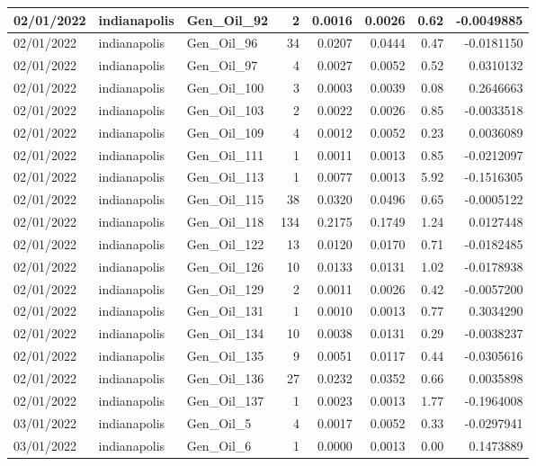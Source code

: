 \documentclass[
  letterpaper,
  DIV=11,
  numbers=noendperiod]{scrartcl}
\begin{document}
\begin{tabular}{l|l|l|r|r|r|r|r}
\hline
02/01/2022 & indianapolis & Gen\_Oil\_92 & 2 & 0.0016 & 0.0026 & 0.62 & -0.0049885\\
\hline
02/01/2022 & indianapolis & Gen\_Oil\_96 & 34 & 0.0207 & 0.0444 & 0.47 & -0.0181150\\
\hline
02/01/2022 & indianapolis & Gen\_Oil\_97 & 4 & 0.0027 & 0.0052 & 0.52 & 0.0310132\\
\hline
02/01/2022 & indianapolis & Gen\_Oil\_100 & 3 & 0.0003 & 0.0039 & 0.08 & 0.2646663\\
\hline
02/01/2022 & indianapolis & Gen\_Oil\_103 & 2 & 0.0022 & 0.0026 & 0.85 & -0.0033518\\
\hline
02/01/2022 & indianapolis & Gen\_Oil\_109 & 4 & 0.0012 & 0.0052 & 0.23 & 0.0036089\\
\hline
02/01/2022 & indianapolis & Gen\_Oil\_111 & 1 & 0.0011 & 0.0013 & 0.85 & -0.0212097\\
\hline
02/01/2022 & indianapolis & Gen\_Oil\_113 & 1 & 0.0077 & 0.0013 & 5.92 & -0.1516305\\
\hline
02/01/2022 & indianapolis & Gen\_Oil\_115 & 38 & 0.0320 & 0.0496 & 0.65 & -0.0005122\\
\hline
02/01/2022 & indianapolis & Gen\_Oil\_118 & 134 & 0.2175 & 0.1749 & 1.24 & 0.0127448\\
\hline
02/01/2022 & indianapolis & Gen\_Oil\_122 & 13 & 0.0120 & 0.0170 & 0.71 & -0.0182485\\
\hline
02/01/2022 & indianapolis & Gen\_Oil\_126 & 10 & 0.0133 & 0.0131 & 1.02 & -0.0178938\\
\hline
02/01/2022 & indianapolis & Gen\_Oil\_129 & 2 & 0.0011 & 0.0026 & 0.42 & -0.0057200\\
\hline
02/01/2022 & indianapolis & Gen\_Oil\_131 & 1 & 0.0010 & 0.0013 & 0.77 & 0.3034290\\
\hline
02/01/2022 & indianapolis & Gen\_Oil\_134 & 10 & 0.0038 & 0.0131 & 0.29 & -0.0038237\\
\hline
02/01/2022 & indianapolis & Gen\_Oil\_135 & 9 & 0.0051 & 0.0117 & 0.44 & -0.0305616\\
\hline
02/01/2022 & indianapolis & Gen\_Oil\_136 & 27 & 0.0232 & 0.0352 & 0.66 & 0.0035898\\
\hline
02/01/2022 & indianapolis & Gen\_Oil\_137 & 1 & 0.0023 & 0.0013 & 1.77 & -0.1964008\\
\hline
03/01/2022 & indianapolis & Gen\_Oil\_5 & 4 & 0.0017 & 0.0052 & 0.33 & -0.0297941\\
\hline
03/01/2022 & indianapolis & Gen\_Oil\_6 & 1 & 0.0000 & 0.0013 & 0.00 & 0.1473889\\

\end{tabular}
\end{document}
